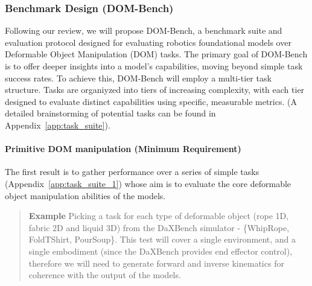 \subsubsection{Benchmark Design (DOM-Bench)}
Following our review, we will propose DOM-Bench, a benchmark suite and evaluation protocol designed for evaluating robotics foundational models over Deformable Object Manipulation (DOM) tasks. The primary goal of DOM-Bench is to offer deeper insights into a model's capabilities, moving beyond simple task success rates.
To achieve this, DOM-Bench will employ a multi-tier task structure. Tasks are organiyzed into tiers of increasing complexity, with each tier designed to evaluate distinct capabilities using specific, measurable metrics. (A detailed brainstorming of potential tasks can be found in Appendix~\ref{app:task_suite}).

\paragraph{\textbf{Primitive DOM manipulation} (Minimum Requirement)}

The first result is to gather performance over a series of simple tasks (Appendix~\ref{app:task_suite_1}) whose aim is to evaluate the core deformable object manipulation abilities of the models.

\begin{quote} %
    \textbf{Example} Picking a task for each type of deformable object (rope 1D, fabric 2D and liquid 3D) from the DaXBench simulator - \{WhipRope, FoldTShirt, PourSoup\}. This test will cover a single environment, and a single embodiment (since the DaXBench provides end effector control), therefore we will need to generate forward and inverse kinematics for coherence with the output of the models.
\end{quote}



